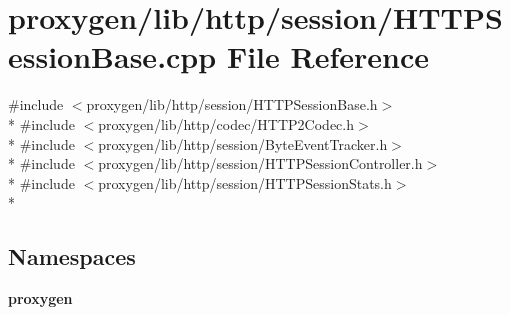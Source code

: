 \section{proxygen/lib/http/session/\+H\+T\+T\+P\+Session\+Base.cpp File Reference}
\label{HTTPSessionBase_8cpp}
{\ttfamily \#include $<$proxygen/lib/http/session/\+H\+T\+T\+P\+Session\+Base.\+h$>$}\\*
{\ttfamily \#include $<$proxygen/lib/http/codec/\+H\+T\+T\+P2\+Codec.\+h$>$}\\*
{\ttfamily \#include $<$proxygen/lib/http/session/\+Byte\+Event\+Tracker.\+h$>$}\\*
{\ttfamily \#include $<$proxygen/lib/http/session/\+H\+T\+T\+P\+Session\+Controller.\+h$>$}\\*
{\ttfamily \#include $<$proxygen/lib/http/session/\+H\+T\+T\+P\+Session\+Stats.\+h$>$}\\*
\subsection*{Namespaces}
\begin{DoxyCompactItemize}
\item 
 {\bf proxygen}
\end{DoxyCompactItemize}
